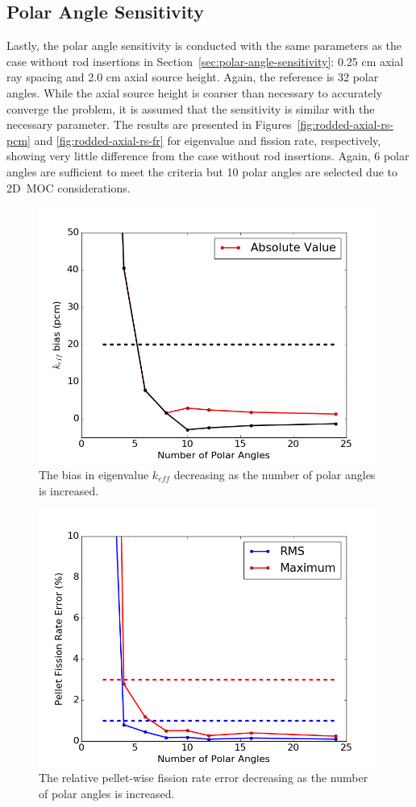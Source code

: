 \subsection{Polar Angle Sensitivity}

Lastly, the polar angle sensitivity is conducted with the same parameters as the case without rod insertions in Section~\ref{sec:polar-angle-sensitivity}: 0.25 cm axial ray spacing and 2.0 cm axial source height. Again, the reference is 32 polar angles. While the axial source height is coarser than necessary to accurately converge the problem, it is assumed that the sensitivity is similar with the necessary parameter. The results are presented in Figures~\ref{fig:rodded-axial-rs-pcm} and \ref{fig:rodded-axial-rs-fr} for eigenvalue and fission rate, respectively, showing very little difference from the case without rod insertions. Again, 6 polar angles are sufficient to meet the criteria but 10 polar angles are selected due to 2D~\ac{MOC} considerations.

\begin{figure}[h!]
	\centering
	\includegraphics[width=0.7\linewidth]{figures/results/sensitivity/rodded_polar_angles_pcm.png}
	\caption[]{The bias in eigenvalue $k_{\textit{eff}}$ decreasing as the number of polar angles is increased.}
	\label{fig:rodded-polar-angles-pcm}
\end{figure}
\begin{figure}[h!]
	\centering
	\includegraphics[width=0.7\linewidth]{figures/results/sensitivity/rodded_polar_angles_fr.png}
	\caption[]{The relative pellet-wise fission rate error decreasing as the number of polar angles is increased.}
	\label{fig:rodded-polar-angles-fr}
\end{figure}

